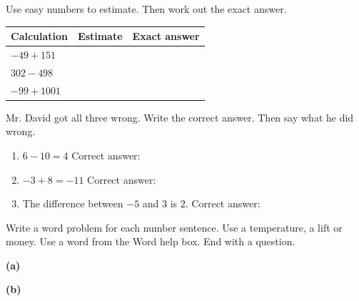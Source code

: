 \documentclass[12pt,a4paper]{article}
\newif\ifkey
\begin{document}
\noindent Use easy numbers to estimate. Then work out the exact answer.

\vspace{6pt}
\noindent
\begin{tabularx}{\textwidth}{|p{3.6cm}|X|X|}
  \hline
  \rule{0pt}{1.6em}\textbf{Calculation} & \textbf{Estimate} & \textbf{Exact answer} \\ \hline
  \rule{0pt}{2.2em}$-49+151$ & & \\ \hline
  \rule{0pt}{2.2em}$302-498$ & & \\ \hline
  \rule{0pt}{2.2em}$-99+1001$ & & \\ \hline
\end{tabularx}


\noindent Mr. David got all three wrong. Write the correct answer. Then say what he did wrong.

\vspace{4pt}
\begin{enumerate}[label=(\alph*), itemsep=6pt]
  \item $6-10=4$ \hfill Correct answer: \blank[2.2cm]
  \item $-3+8=-11$ \hfill Correct answer: \blank[2.2cm]
  \item The difference between $-5$ and $3$ is $2$. \hfill Correct answer: \blank[2.2cm]
\end{enumerate}

\noindent Write a word problem for each number sentence. Use a temperature, a lift
or money. Use a word from the Word help box. End with a question.

\vspace{6pt}
\noindent\textbf{(a)} 

\vspace{8pt}
\noindent\textbf{(b)} 

\ifkey
\newpage
{}
\linespread{1.0}\selectfont
{}
\small
\end{document}
